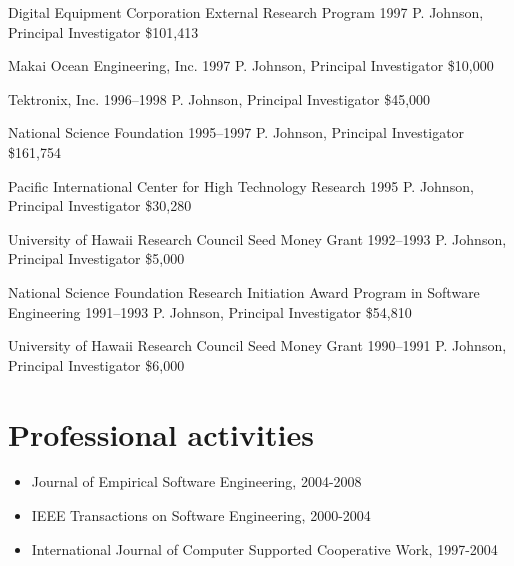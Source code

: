 \documentclass[11pt,letterpaper,sans]{moderncv} %
\begin{document}
        {Digital Equipment Corporation External Research Program} %
        {1997} %
        {P. Johnson, Principal Investigator}  %
        {\$101,413} %

        {Makai Ocean Engineering, Inc.} %
        {1997} %
        {P. Johnson, Principal Investigator}  %
        {\$10,000} %

        {Tektronix, Inc.} %
        {1996--1998} %
        {P. Johnson, Principal Investigator}  %
        {\$45,000} %

        {National Science Foundation} %
        {1995--1997} %
        {P. Johnson, Principal Investigator}  %
        {\$161,754} %

        {Pacific International Center for High Technology Research} %
        {1995} %
        {P. Johnson, Principal Investigator}  %
        {\$30,280} %

        {University of Hawaii Research Council Seed Money Grant} %
        {1992--1993} %
        {P. Johnson, Principal Investigator}  %
        {\$5,000} %

        {National Science Foundation Research Initiation Award Program in Software Engineering} %
        {1991--1993} %
        {P. Johnson, Principal Investigator}  %
        {\$54,810} %

        {University of Hawaii Research Council Seed Money Grant} %
        {1990--1991} %
        {P. Johnson, Principal Investigator}  %
        {\$6,000} %


\section{Professional activities}

\begin{itemize}
\item Journal of Empirical Software Engineering, 2004-2008
\item IEEE Transactions on Software Engineering, 2000-2004
\item International Journal of Computer Supported Cooperative Work, 1997-2004
\end{itemize}
\end{document}
